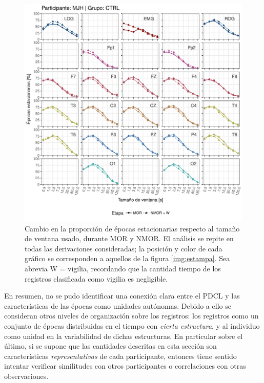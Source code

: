 \documentclass[12pt,letterpaper,draft]{book}
\begin{document}
\begin{figure}
\centering
\includegraphics[width=\linewidth]{./scripts_graf_res/MJNNVIGILOS_cabeza_epocas_v2.pdf}
\caption{Cambio en la proporción de épocas estacionarias respecto al tamaño de ventana usado, durante MOR y NMOR. El análisis se repite en todas las derivaciones consideradas; la posición y color de cada gráfico se corresponden a aquellos de la figura \ref{img:estampa}. Sea abrevia W = vigilia, recordando que la cantidad tiempo de los registros clasificada como vigilia es negligible.}
\label{cabeza_repoio}
\end{figure}

En resumen, no se pudo identificar una conexión clara entre el PDCL y las características de las épocas como unidades autónomas.
%
Debido a ello se consideran otros niveles de organización sobre los registros: los registros como un conjunto de épocas distribuidas en el tiempo con \textit{cierta estructura}, y al individuo como unidad en la variabilidad de dichas estructuras.
%
En particular sobre el último, si se supone que las cantidades descritas en esta sección son características \textit{representativas} de cada participante, entonces tiene sentido intentar verificar similitudes con otros participantes o correlaciones con otras observaciones.

\end{document}
